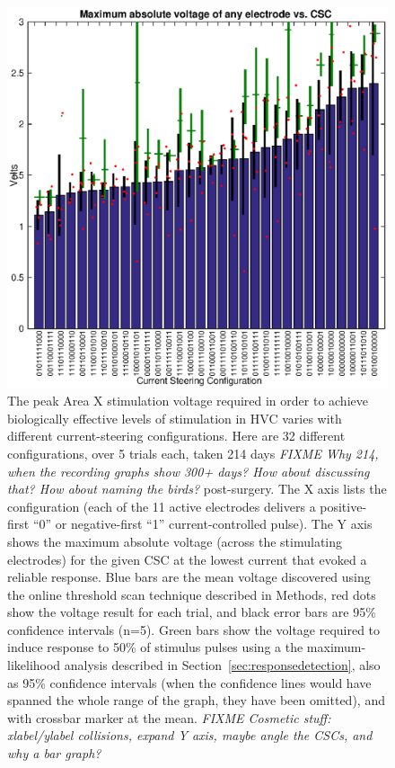 \documentclass[10pt,letterpaper]{article}
\newcommand\sref[1]{Section~\ref{#1}}
\begin{document}
\begin{figure}
  \includegraphics[width=\textwidth]{VoltageVsCSC}
  \caption{The peak Area X stimulation voltage required in order to
    achieve biologically effective levels of stimulation in HVC varies
    with different current-steering configurations.  Here are 32
    different configurations, over 5 trials each, taken 214 days {\em FIXME Why 214, when the recording graphs show 300+ days? How about discussing that? How about naming the birds?}
    post-surgery.  The X axis lists the configuration (each of the 11
    active electrodes delivers a positive-first ``0'' or
    negative-first ``1'' current-controlled pulse).  The Y axis shows
    the maximum absolute voltage (across the stimulating electrodes) for the given CSC at the
    lowest current that evoked a reliable response.  Blue bars are the
    mean voltage discovered using the online threshold scan technique
    described in Methods, red dots show the voltage result for each
    trial, and black error bars are 95\% confidence intervals (n=5).  Green
    bars show the voltage required to induce response to 50\% of
    stimulus pulses using a the maximum-likelihood analysis described in
    \sref{sec:responsedetection}, also as 95\% confidence intervals (when the confidence
    lines would have spanned the whole range of the graph, they have
    been omitted), and with crossbar marker at the mean.
    {\em FIXME Cosmetic stuff: xlabel/ylabel collisions, expand Y axis, maybe angle the CSCs, and why a bar graph?}}
  \label{fig:VoltageVsCSC}
\end{figure}
\end{document}
